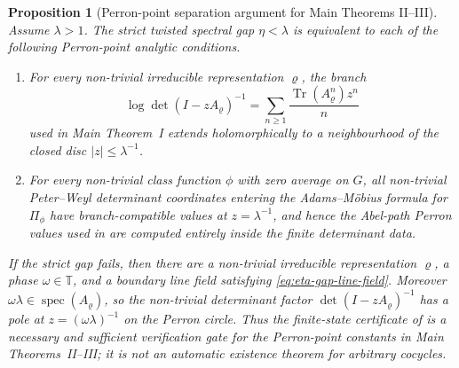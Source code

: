 \documentclass[11pt,a4paper]{amsart}
\theoremstyle{plain}
\newtheorem{proposition}[theorem]{Proposition}
\theoremstyle{definition}
\theoremstyle{remark}
\DeclareMathOperator{\Tr}{Tr}
\DeclareMathOperator{\spec}{spec}
\newcommand{\TT}{\mathbb{T}}
\begin{document}
\begin{proposition}[Perron-point separation argument for Main Theorems II--III]
  \label{prop:eta-gap-perron-separation}
  Assume \(\lambda>1\).  The strict twisted spectral gap
  \(\eta<\lambda\) is equivalent to each of the following Perron-point
  analytic conditions.
  \begin{enumerate}[label=\textup{(\roman*)},leftmargin=*]
  \item For every non-trivial irreducible representation \(\varrho\), the
    branch
    \[
      \log\det(I-zA_\varrho)^{-1}
      =
      \sum_{n\ge1}\frac{\Tr(A_\varrho^n)z^n}{n}
    \]
    used in Main Theorem~I extends holomorphically to a neighbourhood of
    the closed disc \(|z|\le\lambda^{-1}\).
  \item For every non-trivial class function \(\phi\) with zero average on
    \(G\), all non-trivial Peter--Weyl determinant coordinates entering the
    Adams--M\"obius formula for \(\Pi_\phi\) have branch-compatible values at
    \(z=\lambda^{-1}\), and hence the Abel-path Perron values used in
     are
    computed entirely inside the finite determinant data.
  \end{enumerate}
  If the strict gap fails, then there are a non-trivial irreducible
  representation \(\varrho\), a phase \(\omega\in\TT\), and a boundary line
  field satisfying \eqref{eq:eta-gap-line-field}.  Moreover
  \(\omega\lambda\in\spec(A_\varrho)\), so the non-trivial determinant
  factor \(\det(I-zA_\varrho)^{-1}\) has a pole at
  \(z=(\omega\lambda)^{-1}\) on the Perron circle.  Thus the finite-state
  certificate of  is a necessary
  and sufficient verification gate for the Perron-point constants in Main
  Theorems~II--III; it is not an automatic existence theorem for arbitrary
  cocycles.
\end{proposition}
\end{document}
